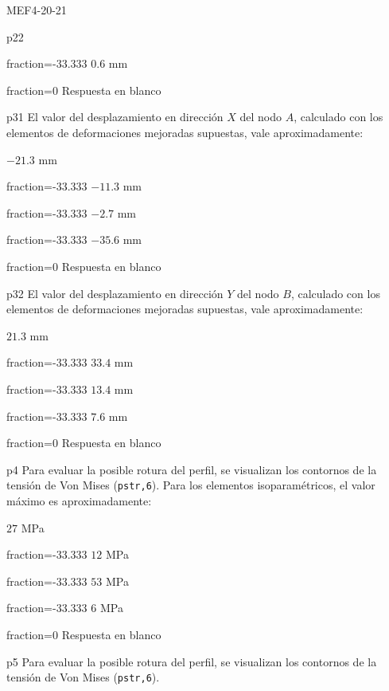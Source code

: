 \documentclass[a4paper]{article}
\begin{document}
\begin{quiz}{MEF4-20-21}
\begin{multi}{p22}
	\item[fraction=-33.333] $0.6$ mm
	\item[fraction=0] Respuesta en blanco
\end{multi}
\begin{multi}{p31}
	El valor del desplazamiento en direcci\'on $X$ del nodo $A$,
	calculado con los elementos de deformaciones mejoradas supuestas,
	vale aproximadamente:
	\item* $-21.3$ mm
	\item[fraction=-33.333] $-11.3$ mm
	\item[fraction=-33.333] $-2.7$ mm
	\item[fraction=-33.333] $-35.6$ mm
	\item[fraction=0] Respuesta en blanco
\end{multi}
\begin{multi}{p32}
	El valor del desplazamiento en direcci\'on $Y$ del nodo $B$,
	calculado con los elementos de deformaciones mejoradas supuestas,
	vale aproximadamente:
	\item* $21.3$ mm
	\item[fraction=-33.333] $33.4$ mm
	\item[fraction=-33.333] $13.4$ mm
	\item[fraction=-33.333] $7.6$ mm
	\item[fraction=0] Respuesta en blanco
\end{multi}
\begin{multi}{p4}
	Para evaluar la posible rotura del perfil, se visualizan 
	los contornos de la tensi\'on de Von Mises ({\tt pstr,6}).
	Para los elementos isoparam\'etricos, el valor m\'aximo es aproximadamente:
	\item* $27$ MPa
	\item[fraction=-33.333] $12$ MPa 
	\item[fraction=-33.333] $53$ MPa
	\item[fraction=-33.333] $6$ MPa
	\item[fraction=0] Respuesta en blanco
\end{multi}
\begin{multi}{p5}
	Para evaluar la posible rotura del perfil, se visualizan 
	los contornos de la tensi\'on de Von Mises ({\tt pstr,6}).

\end{multi}
\end{quiz}
\end{document}
